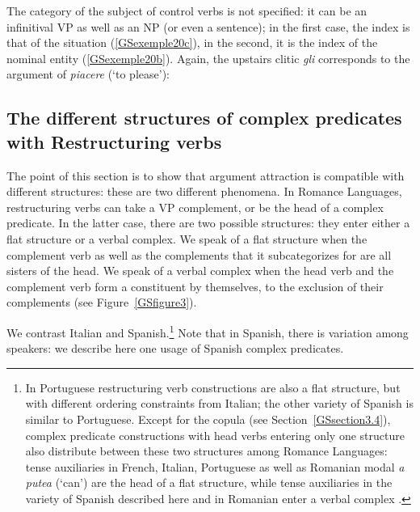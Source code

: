 \documentclass[output=paper
	        ,collection
	        ,collectionchapter
 	        ,biblatex
                ,babelshorthands
                ,newtxmath
                ,draftmode
                ,colorlinks, citecolor=brown
]{langscibook}
\begin{document}
{The category of the subject of control verbs is not specified: it can be an infinitival VP as well as an NP (or even a sentence); in the first case, the index is that of the situation (\ref{GSexemple20c}), in the second, it is the index of the nominal entity (\ref{GSexemple20b}). Again, the upstairs clitic \emph{gli} corresponds to the argument of \emph{piacere} (`to please'):

\eal
	\label{GSexemple20}
    \label{GSexemple20a}

	\label{GSexemple20b}		
		
	\label{GSexemple20c}	
\zl

\subsection{The different structures of complex predicates with Restructuring verbs} \label{GSsection3.2}

The point of this section is to show that argument attraction is compatible with different structures: these are two different phenomena. In Romance Languages, restructuring verbs can take a VP complement, or be the head of a complex predicate. In the latter case, there are two possible structures: they enter either a flat structure or a verbal complex. We speak of a flat structure when the complement verb as well as the complements that it subcategorizes for are all sisters of the head. We speak of a verbal complex when the head verb and the complement verb form a constituent by themselves, to the exclusion of their complements (see Figure~\ref{GSfigure3}).

We contrast Italian and Spanish.\footnote{In Portuguese restructuring verb constructions are also a flat structure, but with different ordering constraints from Italian; the other variety of Spanish is similar to Portuguese. Except for the copula (see Section~\ref{GSsection3.4}), complex predicate constructions with head verbs entering only one structure also distribute between these two structures among Romance Languages: tense auxiliaries in French, Italian, Portuguese as well as Romanian modal \emph{a putea} (`can') are the head of a flat structure, while tense auxiliaries in the variety of Spanish described here and in Romanian enter a verbal complex \citep{AG2010}.} Note that in Spanish, there is variation among speakers: we describe here one usage of Spanish complex predicates. 

}
\end{document}
